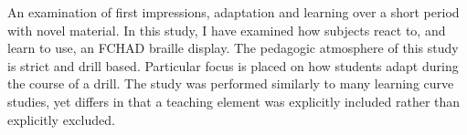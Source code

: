 An examination of first impressions, adaptation and learning over a short period with novel material.
 In this study, I have examined how subjects react to, and learn to use, an FCHAD braille display.  The pedagogic atmosphere of this study is strict and drill based.  Particular focus is placed on how students adapt during the course of a drill.  The study was performed similarly to many learning curve studies, yet differs in that a teaching element was explicitly included rather than explicitly excluded.
